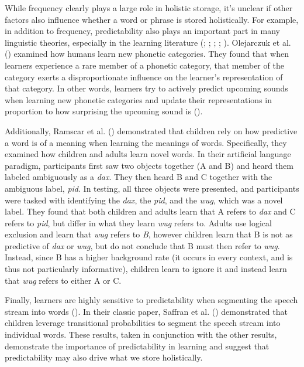 \documentclass[
  12pt,
  letterpaper,
]{scrreprt}
\begin{document}
While frequency clearly plays a large role in holistic storage, it's
unclear if other factors also influence whether a word or phrase is
stored holistically. For example, in addition to frequency,
predictability also plays an important part in many linguistic theories,
especially in the learning literature
(;
;
; ; ). Olejarczuk et al.
()
examined how humans learn new phonetic categories. They found that when
learners experience a rare member of a phonetic category, that member of
the category exerts a disproportionate influence on the learner's
representation of that category. In other words, learners try to
actively predict upcoming sounds when learning new phonetic categories
and update their representations in proportion to how surprising the
upcoming sound is
().

Additionally, Ramscar et al.
()
demonstrated that children rely on how predictive a word is of a meaning
when learning the meanings of words. Specifically, they examined how
children and adults learn novel words. In their artificial language
paradigm, participants first saw two objects together (A and B) and
heard them labeled ambiguously as a \emph{dax}. They then heard B and C
together with the ambiguous label, \emph{pid}. In testing, all three
objects were presented, and participants were tasked with identifying
the \emph{dax}, the \emph{pid}, and the \emph{wug}, which was a novel
label. They found that both children and adults learn that A refers to
\emph{dax} and C refers to \emph{pid}, but differ in what they learn
\emph{wug} refers to. Adults use logical exclusion and learn that
\emph{wug} refers to \emph{B}, however children learn that B is not as
predictive of \emph{dax} or \emph{wug}, but do not conclude that B must
then refer to \emph{wug}. Instead, since B has a higher background rate
(it occurs in every context, and is thus not particularly informative),
children learn to ignore it and instead learn that \emph{wug} refers to
either A or C.

Finally, learners are highly sensitive to predictability when segmenting
the speech stream into words
(). In their classic paper, Saffran et al.
()
demonstrated that children leverage transitional probabilities to
segment the speech stream into individual words. These results, taken in
conjunction with the other results, demonstrate the importance of
predictability in learning and suggest that predictability may also
drive what we store holistically.
\end{document}
